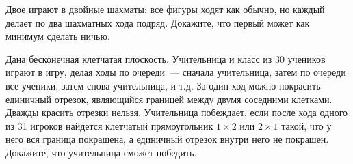 \documentclass{article}
\begin{document}
\begin{enumerate_boxed}
        \item Двое играют в двойные шахматы: все фигуры ходят как обычно, но каждый делает по два шахматных хода подряд.
        Докажите, что первый может как минимум сделать ничью.

        \item Дана бесконечная клетчатая плоскость.
        Учительница и класс из 30 учеников играют в игру, делая ходы по очереди~--- сначала учительница, затем по очереди все ученики, затем снова учительница, и т.д.
        За один ход можно покрасить единичный отрезок, являющийся границей между двумя соседними клетками.
        Дважды красить отрезки нельзя.
        Учительница побеждает, если после хода одного из 31 игроков найдется клетчатый прямоугольник $1 \times 2$ или $2 \times 1$ такой, что у него вся граница покрашена, а единичный отрезок внутри него не покрашен.
        Докажите, что учительница сможет победить.

    \end{enumerate_boxed}
\end{document}
